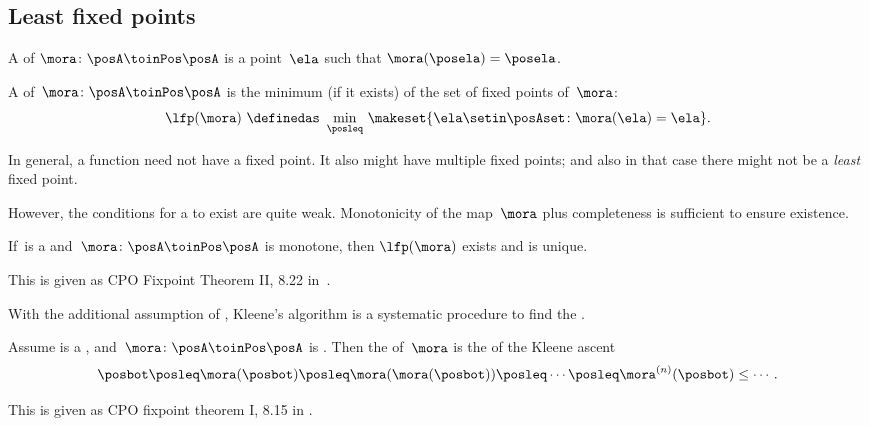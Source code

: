 \subsection{Least fixed points}

\begin{ctdefinition}
    \label{def:fixed-point}
    A  of $\mora\colon\posA\toinPos\posA$ is a point~$\ela$ such that $\mora(\posela)=\posela$.
\end{ctdefinition}

\begin{ctdefinition}
    \label{def:least-fixed-point}
    A  of~$\mora\colon\posA\toinPos\posA$ is the minimum (if it exists) of the set of fixed points of~$\mora$:
    \begin{equation}
        \label{eq:lfp-one}
        \lfp(\mora)\,\,\definedas\,\,\min_{\posleq}\,\makeset{\ela \setin\posAset \colon \mora(\ela)=\ela}.
    \end{equation}
\end{ctdefinition}

In general, a function need not have a fixed point.
It also might have multiple fixed points; and also in that case there might not be a \emph{least} fixed point.

However, the conditions for a  to exist are quite weak.
%
Monotonicity of the map~$\mora$ plus completeness is sufficient to ensure existence.

\begin{lemma}
    \label{lem:CPO-fix-point-2}
    If~\posA is a \CPO and~$\mora\colon\posA\toinPos\posA$ is monotone, then $\lfp(\mora)$ exists and is unique.
\end{lemma}
This is given as CPO Fixpoint Theorem II, 8.22 in~\cite{davey02}.

With the additional assumption of , Kleene's algorithm is a systematic procedure to find the .

\begin{lemma}
    \label{lem:kleene-1}
    Assume \posA is a \CPO, and~$\mora \colon\posA\toinPos\posA$ is .
    Then the  of~$\mora$ is the  of the Kleene ascent  \begin{equation}
        \label{eq:kleene-iteration}
        \posbot\posleq \mora(\posbot)\posleq \mora(\mora(\posbot))\posleq\cdots\posleq \mora^{(n)}(\posbot)\leq\cdots.
    \end{equation}
\end{lemma}
This is given as CPO fixpoint theorem I, 8.15 in \cite{davey02}.

